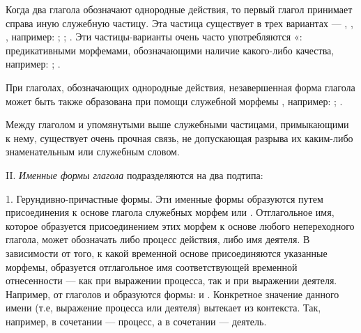 Когда два глагола обозначают однородные действия, то первый глагол принимает справа иную служебную частицу. Эта частица существует в трех вариантах --- , , , например:
;
;
.
Эти частицы-варианты очень часто употребляются «: предикативными морфемами, обозначающими наличие какого-либо качества, например:
;
.

При глаголах, обозначающих однородные действия, незавершенная форма глагола может быть также образована при помощи служебной морфемы , например:
;
.

Между глаголом и упомянутыми выше служебными частицами, примыкающими к нему, существует очень прочная связь, не допускающая разрыва их каким-либо знаменательным или служебным словом.

II. \emph{Именные формы глагола} подразделяются на два подтипа:

1. Герундивно-причастные формы. Эти именные формы образуются путем присоединения к основе глагола служебных морфем  или . Отглагольное имя, которое образуется присоединением этих морфем к основе любого непереходного глагола, может обозначать либо процесс действия, либо имя деятеля. В зависимости от того, к какой временной основе присоединяются указанные морфемы, образуется отглагольное имя соответствующей временной отнесенности --- как при выражении процесса, так и при выражении деятеля. Например, от глаголов  и  образуются формы:  и . Конкретное значение данного имени (т.е, выражение процесса или деятеля) вытекает из контекста. Так, например, в сочетании   --- процесс, а в сочетании   --- деятель.


